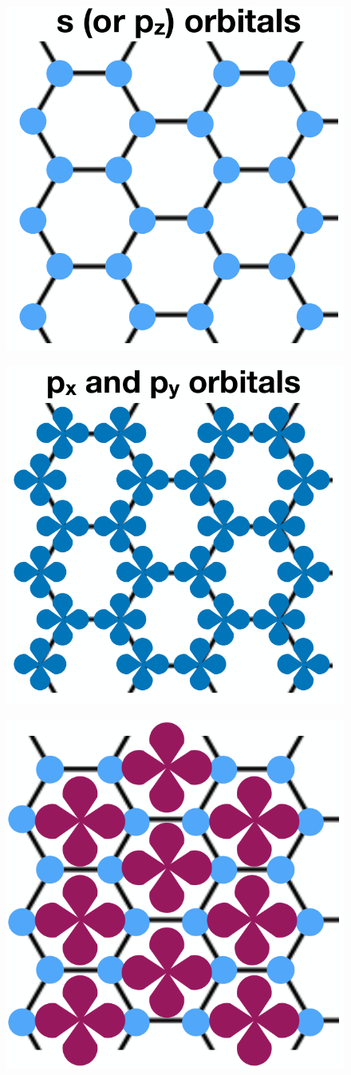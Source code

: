 \documentclass[10pt,aspectratio=169,xcolor={table,dvipsnames}]{beamer}
\begin{document}
\begin{frame}
\begin{minipage}{0.32\textwidth}
\begin{figure}[H]
\centering
\includegraphics[height=0.5\linewidth]{fig/orbitals_pz.png}
\end{figure}
\end{minipage}
\begin{minipage}{0.32\textwidth}
\begin{figure}[H]
\centering
\includegraphics[height=0.5\linewidth]{fig/orbitals_pxpy.png}
\end{figure}
\end{minipage}
\begin{minipage}{0.32\textwidth}
\begin{figure}[H]
\centering
\includegraphics[height=0.5\linewidth]{fig/orbitals_strange.png}
\end{figure}
\end{minipage}

\end{frame}
\end{document}
